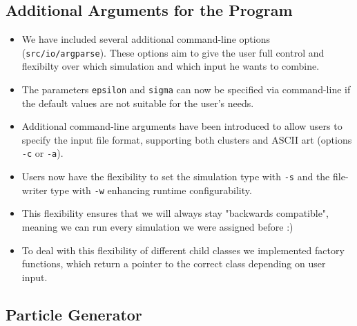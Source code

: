 \documentclass{article}
\begin{document}
\subsection{Additional Arguments for the Program}
\label{subsec:arg}

\begin{itemize}
    \item We have included several additional command-line options (\verb|src/io/argparse|). These options aim to give the user full control and flexibilty over which simulation and which input he wants to combine.
    \item The parameters \texttt{epsilon} and \texttt{sigma} can now be specified via command-line if the default values are not suitable for the user's needs.
    \item Additional command-line arguments have been introduced to allow users to specify the input file format, supporting both clusters and ASCII art (options \texttt{-c} or \texttt{-a}).
    \item Users now have the flexibility to set the simulation type with \texttt{-s} and the file-writer type with \texttt{-w} enhancing runtime configurability.
    \item This flexibility ensures that we will always stay "backwards compatible", meaning we can run every simulation we were assigned before :)
    \item To deal with this flexibility of different child classes we implemented factory functions, which return a pointer to the correct class depending on user input.
\end{itemize}

\subsection{Particle Generator}
\label{subsec:particleGenerator}
\end{document}
